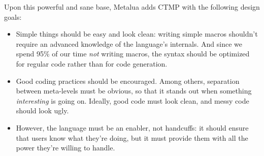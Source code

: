 Upon this powerful and sane base, Metalua adds CTMP with the following
design goals:

\begin{itemize}
\item Simple things should be easy and look clean: writing simple
  macros shouldn't require an advanced knowledge of the language's
  internals. And since we spend 95\% of our time {\em not} writing
  macros, the syntax should be optimized for regular code rather than
  for code generation.
\item Good coding practices should be encouraged. Among others,
  separation between meta-levels must be obvious, so that it stands
  out when something {\em interesting} is going on. Ideally, good code
  must look clean, and messy code should look ugly.
\item However, the language must be an enabler, not handcuffs: it
  should ensure that users know what they're doing, but it must
  provide them with all the power they're willing to handle.
\end{itemize}
